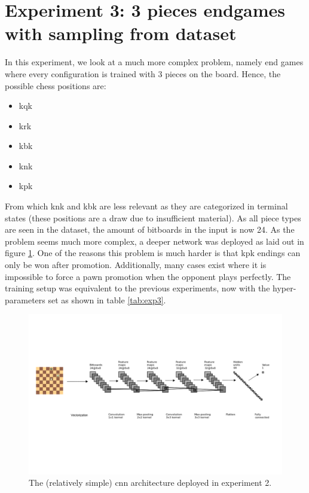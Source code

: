 \section{Experiment 3: 3 pieces endgames with sampling from dataset} 
\label{sec:3p}

In this experiment, we look at a much more complex problem, namely end games where every configuration is trained with 3 pieces on the board. Hence, the possible chess positions are:
\begin{itemize}
\item \gls{kqk}
\item \gls{krk}
\item \gls{kbk}
\item \gls{knk}
\item \gls{kpk}
\end{itemize}
From which \gls{knk} and \gls{kbk} are less relevant as they are categorized in terminal states (these positions are a draw due to insufficient material). As all piece types are seen in the dataset, the amount of bitboards in the input is now 24. As the problem seems much more complex, a deeper network was deployed as laid out in figure \ref{fig:deep}. One of the reasons this problem is much harder is that \gls{kpk} endings can only be won after promotion. Additionally, many cases exist where it is impossible to force a pawn promotion when the opponent plays perfectly. The training setup was equivalent to the previous experiments, now with the hyper-parameters set as shown in table \ref{tab:exp3}.\\
\begin{figure}
\centering
\includegraphics[trim={0 6cm 0 6cm},clip,scale=0.45]{fig/arch/deep}
\caption[\gls{cnn} architecture deployed in experiment 2]{The (relatively simple) \gls{cnn} architecture deployed in experiment 2.}
\label{fig:deep}
\end{figure}

